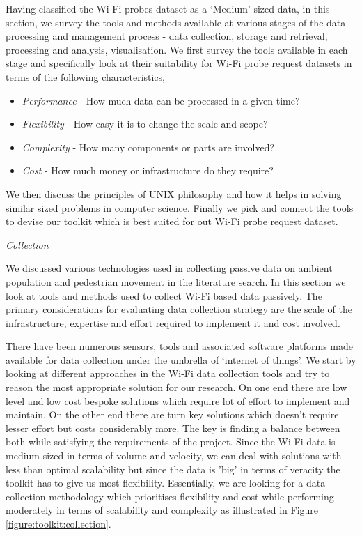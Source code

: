 Having classified the Wi-Fi probes dataset as a `Medium' sized data, in this section, we survey the tools and methods available at various stages of the data processing and management process - data collection, storage and retrieval, processing and analysis, visualisation.
We first survey the tools available in each stage and specifically look at their suitability for Wi-Fi probe request datasets in terms of the following characteristics,

\begin{itemize}
  \setlength{\itemindent}{1em}
  \itemsep-0.25em
  \item \textit{Performance} - How much data can be processed in a given time?
  \item \textit{Flexibility} - How easy it is to change the scale and scope?
  \item \textit{Complexity} - How many components or parts are involved?
  \item \textit{Cost} - How much money or infrastructure do they require?
\end{itemize}

We then discuss the principles of UNIX philosophy and how it helps in solving similar sized problems in computer science. Finally we pick and connect the tools to devise our toolkit which is best suited for out Wi-Fi probe request dataset.


\vspace{1.5em}\noindent\textit{Collection}\vspace{0.5em}

We discussed various technologies used in collecting passive data on ambient population and pedestrian movement in the literature search.
In this section we look at tools and methods used to collect Wi-Fi based data passively.
The primary considerations for evaluating data collection strategy are the scale of the infrastructure, expertise and effort required to implement it and cost involved.

There have been numerous sensors, tools and associated software platforms made available for data collection under the umbrella of `internet of things'.
We start by looking at different approaches in the Wi-Fi data collection tools and try to reason the most appropriate solution for our research.
On one end there are low level and low cost bespoke solutions which require lot of effort to implement and maintain.
On the other end there are turn key solutions which doesn't require lesser effort but costs considerably more.
The key is finding a balance between both while satisfying the requirements of the project.
Since the Wi-Fi data is medium sized in terms of volume and velocity, we can deal with solutions with less than optimal scalability but since the data is 'big' in terms of veracity the toolkit has to give us most flexibility. 
Essentially, we are looking for a data collection methodology which prioritises flexibility and cost while performing moderately in terms of scalability and complexity as illustrated in Figure \ref{figure:toolkit:collection}.


